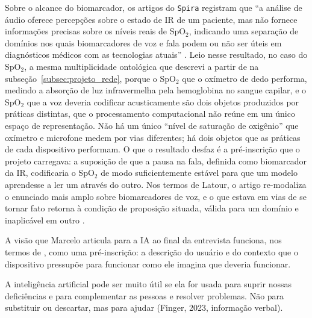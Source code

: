 Sobre o alcance do biomarcador, os artigos do \texttt{Spira} registram que \enquote{a análise de áudio oferece percepções sobre o estado de IR de um paciente, mas não fornece informações precisas sobre os níveis reais de SpO$_2$, indicando uma separação de domínios nos quais biomarcadores de voz e fala podem ou não ser úteis em diagnósticos médicos com as tecnologias atuais} \parencite{Gauy2025Contrasting}. Leio nesse resultado, no caso do SpO$_2$, a mesma multiplicidade ontológica que descrevi a partir de \textcite{mol2002body} na subseção~\ref{subsec:projeto_rede}, porque o SpO$_2$ que o oxímetro de dedo performa, medindo a absorção de luz infravermelha pela hemoglobina no sangue capilar, e o SpO$_2$ que a voz deveria codificar acusticamente são dois objetos produzidos por práticas distintas, que o processamento computacional não reúne em um único espaço de representação. Não há um único \enquote{nível de saturação de oxigênio} que oxímetro e microfone medem por vias diferentes; há dois objetos que as práticas de cada dispositivo performam. O que o resultado desfaz é a pré-inscrição que o projeto carregava: a suposição de que a pausa na fala, definida como biomarcador da IR, codificaria o SpO$_2$ de modo suficientemente estável para que um modelo aprendesse a ler um através do outro. Nos termos de Latour, o artigo re-modaliza o enunciado mais amplo sobre biomarcadores de voz, e o que estava em vias de se tornar fato retorna à condição de proposição situada, válida para um domínio e inaplicável em outro \parencite{Latour2011CienciaEmAcao}.

A visão que Marcelo articula para a IA ao final da entrevista funciona, nos termos de \textcite{Akrich1992Description}, como uma pré-inscrição: a descrição do usuário e do contexto que o dispositivo pressupõe para funcionar como ele imagina que deveria funcionar.

\begin{citacaoabnt}
A inteligência artificial pode ser muito útil se ela for usada para suprir nossas deficiências e para complementar as pessoas e resolver problemas. Não para substituir ou descartar, mas para ajudar (Finger, 2023, informação verbal).
\end{citacaoabnt}

